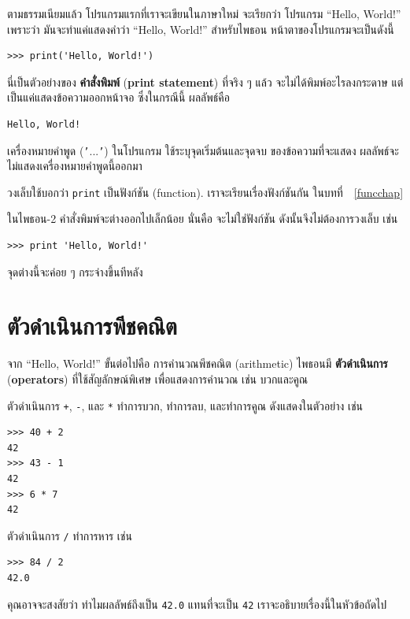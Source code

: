ตามธรรมเนียมแล้ว โปรแกรมแรกที่เราจะเขียนในภาษาใหม่ จะเรียกว่า โปรแกรม ``Hello, World!''
เพราะว่า มันจะทำแค่แสดงคำว่า ``Hello, World!''
สำหรับไพธอน หน้าตาของโปรแกรมจะเป็นดังนี้

\begin{verbatim}
>>> print('Hello, World!')
\end{verbatim}
%
นี่เป็นตัวอย่างของ \textbf{คำสั่งพิมพ์} (\textbf{print statement})
ที่จริง ๆ แล้ว จะไม่ได้พิมพ์อะไรลงกระดาษ
แต่เป็นแค่แสดงข้อความออกหน้าจอ
ซึ่งในกรณีนี้ ผลลัพธ์คือ

\begin{verbatim}
Hello, World!
\end{verbatim}
%
เครื่องหมายคำพูด (\texttt{'}...\texttt{'}) 
ในโปรแกรม ใช้ระบุจุดเริ่มต้นและจุดจบ ของข้อความที่จะแสดง
ผลลัพธ์จะไม่แสดงเครื่องหมายคำพูดนี้ออกมา

วงเล็บใช้บอกว่า \texttt{print} เป็นฟังก์ชัน (function).  
เราจะเรียนเรื่องฟังก์ชันกัน ในบทที่~~\ref{funcchap}
 

ในไพธอน-2 คำสั่งพิมพ์จะต่างออกไปเล็กน้อย 
นั่นคือ จะไม่ใช่ฟังก์ชัน ดังนั้นจึงไม่ต้องการวงเล็บ เช่น

\begin{verbatim}
>>> print 'Hello, World!'
\end{verbatim}
%
จุดต่างนี้จะค่อย ๆ กระจ่างขึ้นทีหลัง 

\section{ตัวดำเนินการพีชคณิต}

จาก ``Hello, World!'' ขั้นต่อไปคือ การคำนวณพีชคณิต (arithmetic)
ไพธอนมี \textbf{ตัวดำเนินการ} (\textbf{operators}) ที่ใช้สัญลักษณ์พิเศษ เพื่อแสดงการคำนวณ เช่น บวกและคูณ

ตัวดำเนินการ \texttt{+}, \texttt{-}, และ \texttt{*} 
ทำการบวก, ทำการลบ, และทำการคูณ ดังแสดงในตัวอย่าง เช่น

\begin{verbatim}
>>> 40 + 2
42
>>> 43 - 1
42
>>> 6 * 7
42
\end{verbatim}
%
ตัวดำเนินการ \texttt{/} ทำการหาร เช่น

\begin{verbatim}
>>> 84 / 2
42.0
\end{verbatim}
%
คุณอาจจะสงสัยว่า ทำไมผลลัพธ์ถึงเป็น \texttt{42.0} แทนที่จะเป็น \texttt{42}
เราจะอธิบายเรื่องนี้ในหัวข้อถัดไป

